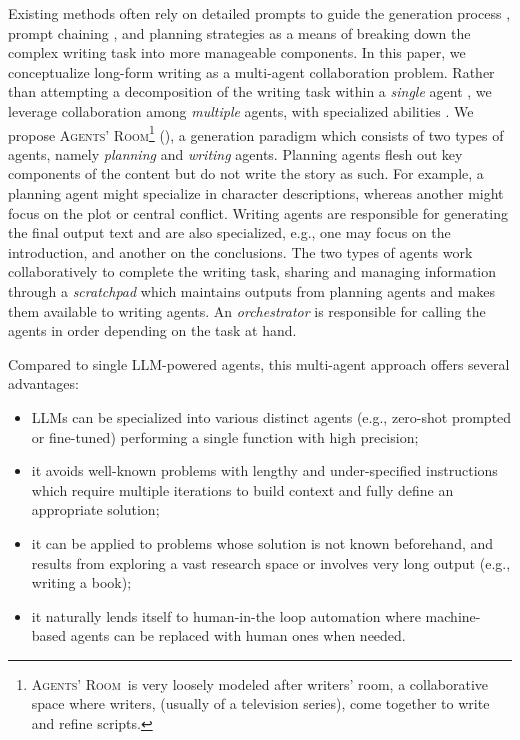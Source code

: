 \documentclass{article}
\newcommand{\Agentsroom}{\textsc{Agents' Room}}
\begin{document}
Existing methods often rely on detailed prompts to guide the
generation process \citep{yang-etal-2022-re3,xie-etal-2023-next},
prompt chaining \citep{piotr:ea:2023,yang-etal-2022-re3}, and planning
strategies
\citep{yang-etal-2023-doc,lee2024navigatingpathwritingoutlineguided}
as a means of breaking down the complex writing task into more
manageable components. In this paper, we conceptualize long-form writing as a multi-agent collaboration problem. Rather than attempting
a decomposition of the writing task within a \emph{single} agent
\citep{chen2023program,yao:ea:2024}, we leverage collaboration among
\emph{multiple} agents, with specialized abilities
\citep{talebirad2023multiagentcollaborationharnessingpower,zhang-etal-2024-exploring,han2024llmmultiagentsystemschallenges}. We
propose \Agentsroom\footnote{\Agentsroom\ is  very loosely modeled after writers' room,  a collaborative space where writers, (usually of a television series), come together to write and refine scripts.} (), a generation paradigm which consists of two types
of agents, namely \emph{planning} and \emph{writing} agents. Planning
agents flesh out key components of the content but do not write the
story as such. For example, a planning agent might specialize in
character descriptions, whereas another might focus on the plot or
central conflict. Writing agents are responsible for generating the
final output text and are also specialized, e.g., one may focus on the
introduction, and another on the conclusions.  The two types of agents
work collaboratively to complete the writing task, sharing and
managing information through a \emph{scratchpad} which maintains
outputs from planning agents and makes them available to writing
agents. An \emph{orchestrator} is responsible for calling the agents in
order depending on the task at hand.

Compared to single LLM-powered agents, this multi-agent approach offers several advantages:

\begin{itemize}
\item LLMs can be  specialized into various distinct agents (e.g., zero-shot prompted or fine-tuned) performing a single function  with high precision; 
\item it avoids well-known problems with lengthy and under-specified
  instructions which require multiple iterations to build context and
  fully define an appropriate solution;
\item it can be applied to problems whose solution is not known beforehand, and results from exploring a vast research space or involves very long output (e.g., writing  a book); 
\item it naturally lends itself to human-in-the loop automation where
  machine-based agents can be replaced with human ones when needed.
\end{itemize}
\end{document}
